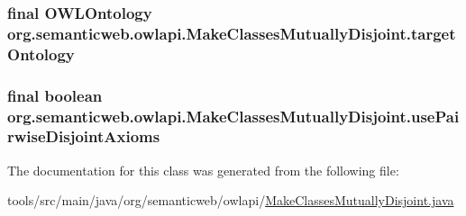 \hypertarget{classorg_1_1semanticweb_1_1owlapi_1_1_make_classes_mutually_disjoint_af9da9ae856c808194f95400759c74d58}{
\subsubsection[{target\-Ontology}]{\setlength{\rightskip}{0pt plus 5cm}final {\bf O\-W\-L\-Ontology} org.\-semanticweb.\-owlapi.\-Make\-Classes\-Mutually\-Disjoint.\-target\-Ontology\hspace{0.3cm}{\ttfamily [private]}}}\label{classorg_1_1semanticweb_1_1owlapi_1_1_make_classes_mutually_disjoint_af9da9ae856c808194f95400759c74d58}
\hypertarget{classorg_1_1semanticweb_1_1owlapi_1_1_make_classes_mutually_disjoint_a85748e7becd8aa020ef09bd443b3b5a3}{
\subsubsection[{use\-Pairwise\-Disjoint\-Axioms}]{\setlength{\rightskip}{0pt plus 5cm}final boolean org.\-semanticweb.\-owlapi.\-Make\-Classes\-Mutually\-Disjoint.\-use\-Pairwise\-Disjoint\-Axioms\hspace{0.3cm}{\ttfamily [private]}}}\label{classorg_1_1semanticweb_1_1owlapi_1_1_make_classes_mutually_disjoint_a85748e7becd8aa020ef09bd443b3b5a3}


The documentation for this class was generated from the following file\-:\begin{DoxyCompactItemize}
\item 
tools/src/main/java/org/semanticweb/owlapi/\hyperlink{_make_classes_mutually_disjoint_8java}{Make\-Classes\-Mutually\-Disjoint.\-java}\end{DoxyCompactItemize}
